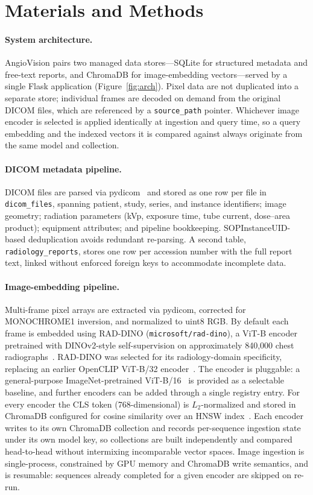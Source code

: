 \documentclass[11pt]{article}
\begin{document}
\section{Materials and Methods}

\paragraph{System architecture.}
AngioVision pairs two managed data stores---SQLite for structured metadata and
free-text reports, and ChromaDB for image-embedding vectors---served by a single
Flask application (Figure~\ref{fig:arch}). Pixel data are not duplicated into a
separate store; individual frames are decoded on demand from the original DICOM
files, which are referenced by a \texttt{source\_path} pointer. Whichever image
encoder is selected is applied identically at ingestion and query time, so a
query embedding and the indexed vectors it is compared against always originate
from the same model and collection.

\paragraph{DICOM metadata pipeline.}
DICOM files are parsed via pydicom~\cite{mason2011pydicom} and stored as one row
per file in \texttt{dicom\_files}, spanning patient, study, series, and instance
identifiers; image geometry; radiation parameters (kVp, exposure time, tube
current, dose--area product); equipment attributes; and pipeline bookkeeping.
SOPInstanceUID-based deduplication avoids redundant re-parsing. A second table,
\texttt{radiology\_reports}, stores one row per accession number with the full
report text, linked without enforced foreign keys to accommodate incomplete data.

\paragraph{Image-embedding pipeline.}
Multi-frame pixel arrays are extracted via pydicom, corrected for MONOCHROME1
inversion, and normalized to uint8 RGB. By default each frame is embedded using
RAD-DINO (\texttt{microsoft/rad-dino}), a ViT-B encoder pretrained with
DINOv2-style self-supervision on approximately 840{,}000 chest
radiographs~\cite{perezgarcia2024raddino,oquab2024dinov2}. RAD-DINO was selected
for its radiology-domain specificity, replacing an earlier OpenCLIP
ViT-B/32 encoder~\cite{radford2021clip}. The encoder is pluggable: a
general-purpose ImageNet-pretrained ViT-B/16~\cite{dosovitskiy2021vit} is
provided as a selectable baseline, and further encoders can be added through a
single registry entry. For every encoder the CLS token (768-dimensional) is
$L_2$-normalized and stored in ChromaDB configured for cosine similarity over an
HNSW index~\cite{malkov2020hnsw}. Each encoder writes to its own ChromaDB
collection and records per-sequence ingestion state under its own model key, so
collections are built independently and compared head-to-head without
intermixing incomparable vector spaces. Image ingestion is single-process,
constrained by GPU memory and ChromaDB write semantics, and is resumable:
sequences already completed for a given encoder are skipped on re-run.
\end{document}
